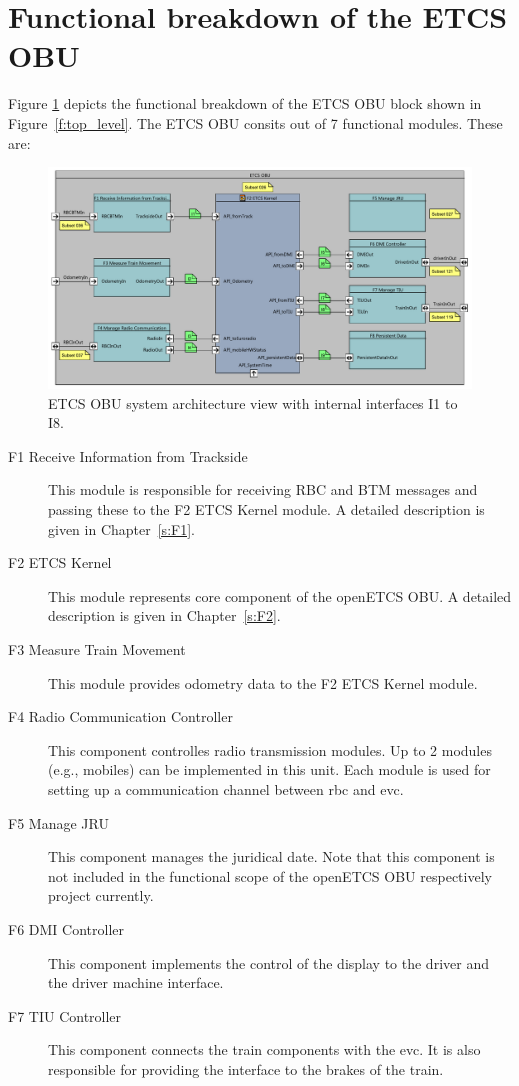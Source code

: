 \section{Functional breakdown of the ETCS OBU}

Figure \ref{f:ETCS_OBU_decomposition} depicts the functional breakdown of the ETCS OBU block shown in Figure~\ref{f:top_level}. The ETCS OBU consits out of 7 functional modules. These are:
\begin{figure}
\centering
\includegraphics[width=\textwidth]{images/F2_ETCS_Kernel.pdf}
\caption{ETCS OBU system architecture view with internal interfaces I1 to I8.}
\label{f:ETCS_OBU_decomposition}
\end{figure}
\begin{description}
\item[F1 Receive Information from Trackside] This module is responsible for receiving RBC and BTM messages and passing these to the F2 ETCS Kernel module. A detailed description is given in Chapter~\ref{s:F1}.
\item[F2 ETCS Kernel] This module represents core component of the openETCS OBU. A detailed description is given in Chapter~\ref{s:F2}.
\item[F3 Measure Train Movement] This module provides odometry data to the F2 ETCS Kernel module.
\item[F4 Radio Communication Controller] This component controlles radio transmission modules. Up to 2 modules (e.g., mobiles) can be implemented in this unit. Each module is used for setting up a communication channel between rbc and evc. 
\item[F5 Manage JRU] This component manages the juridical date. Note that this component is not included in the functional scope of the openETCS OBU respectively project currently.
\item[F6 DMI Controller] This component implements the control of the display to the driver and the driver machine interface. 
\item[F7 TIU Controller] This component connects the train components with the evc. It is also responsible for providing the interface to the brakes of the train.

\end{description}

